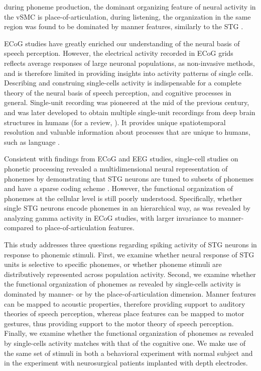during phoneme production, the dominant organizing feature of neural activity in the vSMC is place-of-articulation, during listening, the organization in the same region was found to be dominated by manner features, similarly to the STG \citep{cheung2016auditory}.

ECoG studies have greatly enriched our understanding of the neural basis of speech perception.  However, the electrical activity recorded in ECoG grids reflects average responses of large neuronal populations, as non-invasive methods, and is therefore limited in providing insights into activity patterns of single cells. Describing and construing single-cells activity is indispensable for a complete theory of the neural basis of speech perception, and cognitive processes in general. Single-unit recording was pioneered at the mid of the previous century, and was later developed to obtain multiple single-unit recordings from deep brain structures in humans \citep{fried1999cerebral} (for a review, \citealp{engel2005invasive, mukamel2012human, cash2015emergence}). It provides unique spatiotemporal resolution and valuable information about processes that are unique to humans, such as language \citep{heit1988neural, creutzfeldt1989neuronal, tankus2012structured, ossmy2015decoding}.

Consistent with findings from ECoG and EEG studies, single-cell studies on phonetic processing revealed a multidimensional neural representation of phonemes by demonstrating that STG neurons are tuned to subsets of phonemes and have a sparse coding scheme \citep{creutzfeldt1989neuronal, chan2013speech}. However, the functional organization of phonemes at the cellular level is still poorly understood. Specifically, whether single STG neurons encode phonemes in an hierarchical way, as was revealed by analyzing gamma activity in ECoG studies, with larger invariance to manner- compared to place-of-articulation features.

This study addresses three questions regarding spiking activity of STG neurons in response to phonemic stimuli. First, we examine whether neural response of STG units is selective to specific phonemes, or whether phoneme stimuli are distributively represented across population activity. Second, we examine whether the functional organization of phonemes as revealed by single-cells activity is dominated by manner- or by the place-of-articulation dimension. Manner features can be mapped to acoustic properties, therefore providing support to auditory theories of speech perception, whereas place features can be mapped to motor gestures, thus providing support to the motor theory of speech perception. Finally, we examine whether the functional organization of phonemes as revealed by single-cells activity matches with that of the cognitive one. We make use of the same set of stimuli in both a behavioral experiment with normal subject and in the experiment with neurosurgical patients implanted with depth electrodes.

